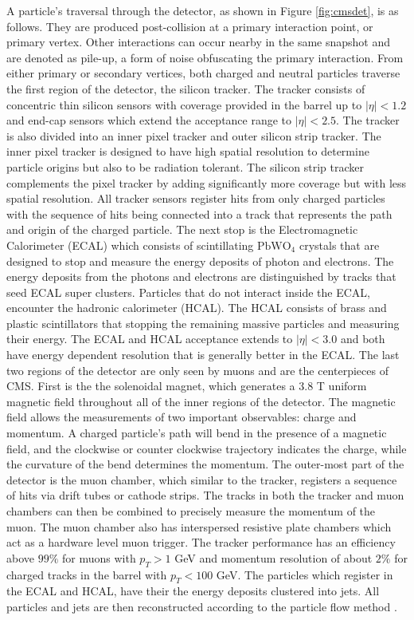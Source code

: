 A particle's traversal through the detector, as shown in Figure \ref{fig:cmsdet}, is as follows. They are produced post-collision at a primary interaction point, or primary vertex. Other interactions can occur nearby in the same snapshot and are denoted as pile-up, a form of noise obfuscating the primary interaction. From either primary or secondary vertices, both charged and neutral particles traverse the first region of the detector, the silicon tracker. The tracker consists of concentric thin silicon sensors with coverage provided in the barrel up to $|\eta|<1.2$ and end-cap sensors which extend the acceptance range to $|\eta| < 2.5$. The tracker is also divided into an inner pixel tracker and outer silicon strip tracker. The inner pixel tracker is designed to have high spatial resolution to determine particle origins but also to be radiation tolerant. The silicon strip tracker complements the pixel tracker by adding significantly more coverage but with less spatial resolution. All tracker sensors  register hits from only charged particles with the sequence of hits being connected into a track that represents the path and origin of the charged particle.  The next stop is the Electromagnetic Calorimeter (ECAL) which consists of scintillating $\text{PbWO}_4$ crystals that are designed to stop and measure the energy deposits of photon and electrons. The energy deposits from the photons and electrons are distinguished by tracks that seed ECAL super clusters. Particles that do not interact inside the ECAL, encounter the hadronic calorimeter (HCAL). The HCAL consists of brass and plastic scintillators that stopping the remaining massive particles and measuring their energy. The ECAL and HCAL acceptance extends to $|\eta| <3.0$ and both have energy dependent resolution that is generally better in the ECAL. The last two regions of the detector are only seen by muons and are the centerpieces of CMS. First is the the solenoidal magnet, which generates a 3.8 T uniform magnetic field throughout all of the inner regions of the detector. The magnetic field allows the measurements of two important observables: charge and momentum.  A charged particle's path will bend in the presence of a magnetic field, and the clockwise or counter clockwise trajectory indicates the charge, while the curvature of the bend determines the momentum. The outer-most part of the detector is the muon chamber, which similar to the tracker, registers a sequence of hits via drift tubes or cathode strips. The tracks in both the tracker and muon chambers can then be combined to precisely measure the momentum of the muon. The muon chamber also has interspersed resistive plate chambers which act as a hardware level muon trigger. The tracker performance has an efficiency above $99\%$ for muons with $p_T > 1$ GeV and momentum resolution of about $2\%$ for charged tracks in the barrel with $p_T < 100$ GeV. The particles which register in the ECAL and HCAL, have their the energy deposits clustered into jets. All particles and jets are then reconstructed according to the particle flow method \cite{CMS:2017yfk}. \cite{CMS:2008xjf} \cite{CMS:2017lum}

